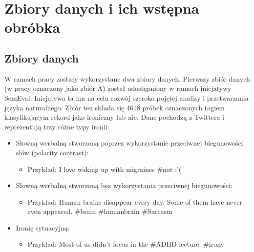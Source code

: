 \newpage %
\section{Zbiory danych i ich wstępna obróbka} \label{dane_wejsciowe}
\subsection{Zbiory danych} \label{dane_wejsciowe}



W ramach pracy zostały wykorzystane dwa zbiory danych. Pierwszy zbiór danych (w pracy oznaczony jako zbiór A) został udostępniony w ramach inicjatywy SemEval. Inicjatywa ta ma na celu rozwój szeroko pojętej analizy i przetwarzania języka naturalnego. Zbiór ten składa się 4618 próbek oznaczonych tagiem klasyfikującym rekord jako ironiczny lub nie. Dane pochodzą z Twittera i reprezentują trzy różne typy ironii:
\begin{itemize}
    \item Słowną werbalną stworzoną poprzez wykorzystanie przeciwnej biegunowości słów (polarity contrast):
          \begin{itemize}
              \item Przykład: I love waking up with migraines \#not :'(
          \end{itemize}

    \item Słowną werbalną stworzoną bez wykorzystania przeciwnej biegunowości:
          \begin{itemize}
              \item Przykład: Human brains disappear every day. Some of them have never even appeared. \#brain \#humanbrain \#Sarcasm
          \end{itemize}

    \item Ironię sytuacyjną:
          \begin{itemize}
              \item Przykład: Most of us didn't focus in the \#ADHD lecture. \#irony
          \end{itemize}
\end{itemize}



